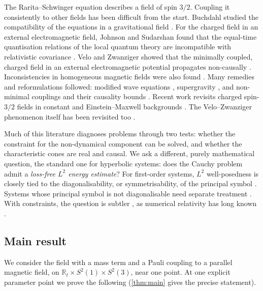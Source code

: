 \documentclass[11pt]{article}
\theoremstyle{plain}
\theoremstyle{definition}
\theoremstyle{remark}
\newcommand{\R}{\mathbb{R}}
\begin{document}
The Rarita--Schwinger equation \citep{RaritaSchwinger1941} describes a field of spin $3/2$. Coupling it consistently to other fields has been difficult from the start. Buchdahl studied the compatibility of the equations in a gravitational field \citep{Buchdahl1958}. For the charged field in an external electromagnetic field, Johnson and Sudarshan found that the equal-time quantisation relations of the local quantum theory are incompatible with relativistic covariance \citep{JohnsonSudarshan1961}. Velo and Zwanziger showed that the minimally coupled, charged field in an external electromagnetic potential propagates non-causally \citep{VeloZwanziger1969}. Inconsistencies in homogeneous magnetic fields were also found \citep{SeetharamanPrabhakaranMathews1975}. Many remedies and reformulations followed: modified wave equations \citep{Khalil1977}, supergravity \citep{DeserZumino1976}, and non-minimal couplings and their causality bounds \citep{DeserPascalutsaWaldron2000,DeserWaldron2002,PorratiRahman2009,Rahman2013}. Recent work revisits charged spin-$3/2$ fields in constant and Einstein--Maxwell backgrounds \citep{BenakliDanielKe2023,DelplanqueSkvortsov2024,Benakli2026,KrawczykEtAl2026}. The Velo--Zwanziger phenomenon itself has been revisited too \citep{Frauendiener2003}.

Much of this literature diagnoses problems through two tests: whether the constraint for the non-dynamical component can be solved, and whether the characteristic cones are real and causal. We ask a different, purely mathematical question, the standard one for hyperbolic systems: does the Cauchy problem admit a \emph{loss-free $L^2$ energy estimate}? For first-order systems, $L^2$ well-posedness is closely tied to the diagonalisability, or symmetrisability, of the principal symbol \citep{Kreiss1962,Strang1966,Strang1967,IvriiPetkov1974,Metivier2014,BenzoniGavageSerre2006,Rauch2012}. Systems whose principal symbol is not diagonalisable need separate treatment \citep{GarettoJahRuzhansky2018,ColombiniNishitaniRauch2019}. With constraints, the question is subtler \citep{AbalosReula2020,Abalos2022}, as numerical relativity has long known \citep{KreissOrtiz2002,NagyOrtizReula2004,SarbachTiglio2012}.

\subsection{Main result}\label{sec:intro-result}

We consider the field with a mass term and a Pauli coupling to a parallel magnetic field, on $\R_t\times S^2(1)\times S^2(3)$, near one point. At one explicit parameter point we prove the following (\cref{thm:main} gives the precise statement).
\end{document}
